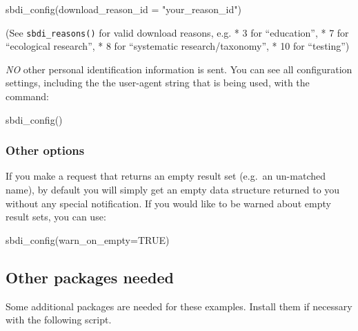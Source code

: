 \documentclass[
  10pt,
]{article}
\newenvironment{Shaded}{\begin{snugshade}}{\end{snugshade}}
\newcommand{\AttributeTok}[1]{\textcolor[rgb]{0.77,0.63,0.00}{#1}}
\newcommand{\ConstantTok}[1]{\textcolor[rgb]{0.00,0.00,0.00}{#1}}
\newcommand{\FunctionTok}[1]{\textcolor[rgb]{0.00,0.00,0.00}{#1}}
\newcommand{\NormalTok}[1]{#1}
\newcommand{\StringTok}[1]{\textcolor[rgb]{0.31,0.60,0.02}{#1}}
\begin{document}
\begin{Shaded}
\begin{Highlighting}[]
\FunctionTok{sbdi\_config}\NormalTok{(}\AttributeTok{download\_reason\_id =} \StringTok{"your\_reason\_id"}\NormalTok{)}
\end{Highlighting}
\end{Shaded}

(See \texttt{sbdi\_reasons()} for valid download reasons, e.g.
* 3 for ``education'',
* 7 for ``ecological research'',
* 8 for ``systematic research/taxonomy'',
* 10 for ``testing'')

\emph{NO} other personal identification information is sent. You can see all
configuration settings, including the the user-agent string that is
being used, with the command:

\begin{Shaded}
\begin{Highlighting}[]
\FunctionTok{sbdi\_config}\NormalTok{()}
\end{Highlighting}
\end{Shaded}

\hypertarget{other-options}{%
\subsubsection*{Other options}\label{other-options}}

If you make a request that returns an empty result set (e.g.~an
un-matched name), by default you will simply get an empty data structure
returned to you without any special notification. If you would like to
be warned about empty result sets, you can use:

\begin{Shaded}
\begin{Highlighting}[]
\FunctionTok{sbdi\_config}\NormalTok{(}\AttributeTok{warn\_on\_empty=}\ConstantTok{TRUE}\NormalTok{)}
\end{Highlighting}
\end{Shaded}

\hypertarget{other-packages-needed}{%
\subsection*{Other packages needed}\label{other-packages-needed}}

Some additional packages are needed for these examples. Install them if necessary
with the following script.
\end{document}
